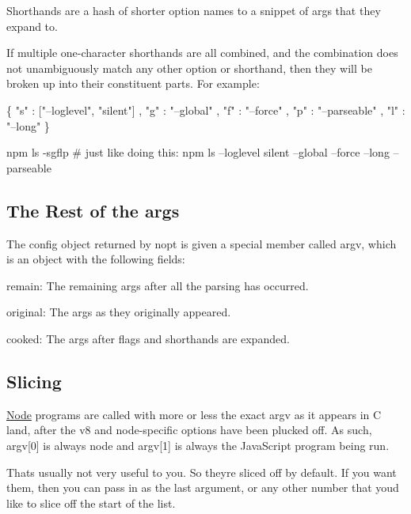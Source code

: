 Shorthands are a hash of shorter option names to a snippet of args that they expand to.

If multiple one-\/character shorthands are all combined, and the combination does not unambiguously match any other option or shorthand, then they will be broken up into their constituent parts. For example\+:


\begin{DoxyCode}
\{ "s" : ["--loglevel", "silent"]
, "g" : "--global"
, "f" : "--force"
, "p" : "--parseable"
, "l" : "--long"
\}
\end{DoxyCode}



\begin{DoxyCode}
npm ls -sgflp
# just like doing this:
npm ls --loglevel silent --global --force --long --parseable
\end{DoxyCode}


\subsection*{The Rest of the args}

The config object returned by nopt is given a special member called {\ttfamily argv}, which is an object with the following fields\+:


\begin{DoxyItemize}
\item {\ttfamily remain}\+: The remaining args after all the parsing has occurred.
\item {\ttfamily original}\+: The args as they originally appeared.
\item {\ttfamily cooked}\+: The args after flags and shorthands are expanded.
\end{DoxyItemize}

\subsection*{Slicing}

\mbox{\hyperlink{classNode}{Node}} programs are called with more or less the exact argv as it appears in C land, after the v8 and node-\/specific options have been plucked off. As such, {\ttfamily argv\mbox{[}0\mbox{]}} is always {\ttfamily node} and {\ttfamily argv\mbox{[}1\mbox{]}} is always the Java\+Script program being run.

That\textquotesingle{}s usually not very useful to you. So they\textquotesingle{}re sliced off by default. If you want them, then you can pass in {} as the last argument, or any other number that you\textquotesingle{}d like to slice off the start of the list. 